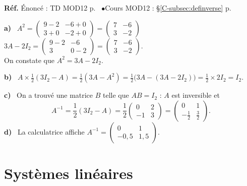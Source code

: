 \documentclass[a4paper,11pt]{article}
\newcommand{\M}[1]{\begin{pmatrix}#1\end{pmatrix}}
\newcommand{\cours}[1]{§\ref{C-#1} p.~\pageref{C-#1}}
\newcommand{\source}[2]{{\footnotesize\color{uimmgray}\textbf{Réf.} \enspace Énoncé : TD MOD12 p.~\pageref{T-#1} \enspace$\bullet$\enspace Cours MOD12 : #2}\par\smallskip}
\newcommand{\q}[1]{\textbf{\color{uimmblue}#1}\ }
\begin{document}
\begin{correction}
\source{exo:12}{\cours{subsec:definverse}}
\q{a)} $A^2 = \M{9-2 & -6+0\\ 3+0 & -2+0} = \M{7 & -6\\ 3 & -2}$ \qquad $3A - 2I_2 = \M{9-2 & -6\\ 3 & 0-2} = \M{7 & -6\\ 3 & -2}$.\\
On constate que $A^2 = 3A - 2I_2$.

\q{b)} $A\times\frac12(3I_2 - A) = \frac12(3A - A^2) = \frac12\big(3A - (3A - 2I_2)\big) = \frac12\times 2I_2 = I_2$.

\q{c)} On a trouvé une matrice $B$ telle que $AB = I_2$ : $A$ est inversible et
\[
A^{-1} = \frac12(3I_2 - A) = \frac12\M{0 & 2\\ -1 & 3} = \M{0 & 1\\ -\frac12 & \frac32}.
\]
\q{d)} La calculatrice affiche $A^{-1} = \M{0 & 1\\ -0{,}5 & 1{,}5}$.
\end{correction}

\needspace{8cm}
\section{Systèmes linéaires}
\end{document}
